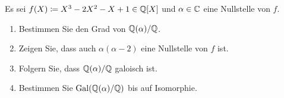 \begin{question}
  Es sei $f(X) \coloneqq X^3 - 2 X^2 - X + 1 \in \mathbb{Q}[X]$ und $\alpha \in \mathbb{C}$ eine Nullstelle von $f$.
  \begin{enumerate}
    \item
      Bestimmen Sie den Grad von $\mathbb{Q}(\alpha) / \mathbb{Q}$.
    \item
      Zeigen Sie, dass auch $\alpha(\alpha-2)$ eine Nullstelle von $f$ ist.
    \item
      Folgern Sie, dass $\mathbb{Q}(\alpha)/\mathbb{Q}$ galoisch ist.
    \item
      Bestimmen Sie $\operatorname{Gal}(\mathbb{Q}(\alpha)/\mathbb{Q})$ bis auf Isomorphie.
  \end{enumerate}
\end{question}


